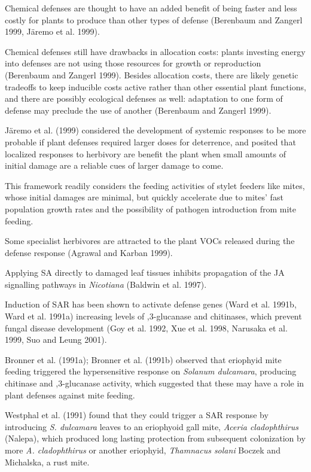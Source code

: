 \documentclass[12pt,final,CPage]{ufthesis}
\begin{document}
{  Chemical defenses are thought to have an added benefit of being faster and less costly for plants to produce than other types of defense (Berenbaum and Zangerl 1999, Järemo et al. 1999).

  Chemical defenses still have drawbacks in allocation costs: plants investing energy into defenses are not using those resources for growth or reproduction (Berenbaum and Zangerl 1999).
  Besides allocation costs, there are likely genetic tradeoffs to keep inducible costs active rather than other essential plant functions, and there are possibly ecological defenses as well: adaptation to one form of defense may preclude the use of another (Berenbaum and Zangerl 1999).

  Järemo et al. (1999) considered the development of systemic responses to be more probable if plant defenses required larger doses for deterrence, and posited that localized responses to herbivory are benefit the plant when small amounts of initial damage are a reliable cues of larger damage to come.

  This framework readily considers the feeding activities of stylet feeders like mites, whose initial damages are minimal, but quickly accelerate due to mites' fast population growth rates and the possibility of pathogen introduction from mite feeding.

  Some specialist herbivores are attracted to the plant VOCs released during the defense response (Agrawal and Karban 1999).

  Applying SA directly to damaged leaf tissues inhibits propagation of the JA signalling pathways in \emph{Nicotiana} (Baldwin et al. 1997).

  Induction of SAR has been shown to activate defense genes (Ward et al. 1991b, Ward et al. 1991a) increasing levels of ,3-glucanase and chitinases, which prevent fungal disease development (Goy et al. 1992, Xue et al. 1998, Narusaka et al. 1999, Suo and Leung 2001).

  Bronner et al. (1991a); Bronner et al. (1991b) observed that eriophyid mite feeding triggered the hypersensitive response on \emph{Solanum dulcamara}, producing chitinase and ,3-glucanase activity, which suggested that these may have a role in plant defenses against mite feeding.

  Westphal et al. (1991) found that they could trigger a SAR response by introducing \emph{S. dulcamara} leaves to an eriophyoid gall mite, \emph{Aceria cladophthirus} (Nalepa), which produced long lasting protection from subsequent colonization by more \emph{A. cladophthirus} or another eriophyid, \emph{Thamnacus solani} Boczek and Michalska, a rust mite.

}
\end{document}
